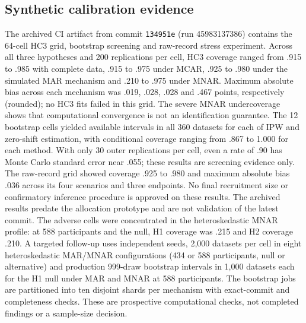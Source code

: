 \documentclass[11pt,a4paper]{article}
\begin{document}
\subsection{Synthetic calibration evidence}
The archived CI artifact from commit \texttt{134951e} (run 45983137386) contains the 64-cell HC3 grid, bootstrap screening and raw-record stress experiment. Across all three hypotheses and 200 replications per cell, HC3 coverage ranged from .915 to .985 with complete data, .915 to .975 under MCAR, .925 to .980 under the simulated MAR mechanism and .210 to .975 under MNAR. Maximum absolute bias across each mechanism was .019, .028, .028 and .467 points, respectively (rounded); no HC3 fits failed in this grid. The severe MNAR undercoverage shows that computational convergence is not an identification guarantee. The 12 bootstrap cells yielded available intervals in all 360 datasets for each of IPW and zero-shift estimation, with conditional coverage ranging from .867 to 1.000 for each method. With only 30 outer replications per cell, even a rate of .90 has Monte Carlo standard error near .055; these results are screening evidence only. The raw-record grid showed coverage .925 to .980 and maximum absolute bias .036 across its four scenarios and three endpoints. No final recruitment size or confirmatory inference procedure is approved on these results. The archived results predate the allocation prototype and are not validation of the latest commit. The adverse cells were concentrated in the heteroskedastic MNAR profile: at 588 participants and the null, H1 coverage was .215 and H2 coverage .210. A targeted follow-up uses independent seeds, 2,000 datasets per cell in eight heteroskedastic MAR/MNAR configurations (434 or 588 participants, null or alternative) and production 999-draw bootstrap intervals in 1,000 datasets each for the H1 null under MAR and MNAR at 588 participants. The bootstrap jobs are partitioned into ten disjoint shards per mechanism with exact-commit and completeness checks. These are prospective computational checks, not completed findings or a sample-size decision.
\end{document}
